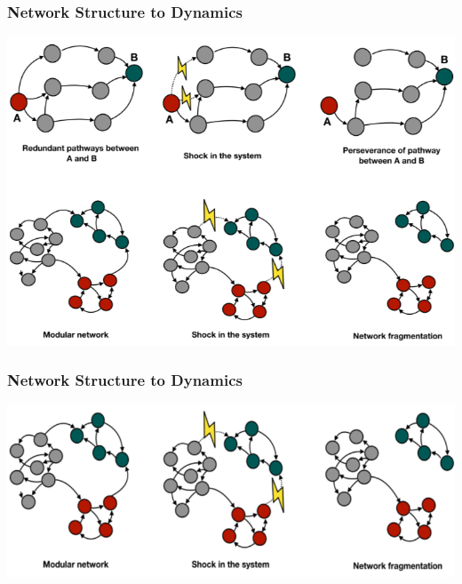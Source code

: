 \documentclass[aspectratio=169]{beamer}
\begin{document}
\begin{frame}
     \frametitle{Network Structure to Dynamics}
     \begin{center}
        \includegraphics[width=0.5\paperwidth]{images/net_info_dynamics_inset.PNG}
     \end{center}
     
\end{frame}

\begin{frame}
     \frametitle{Network Structure to Dynamics}
     \begin{center}
        \includegraphics[width=0.5\paperwidth]{images/net_info_dynamics.PNG}
     \end{center}
     
\end{frame}
\end{document}
